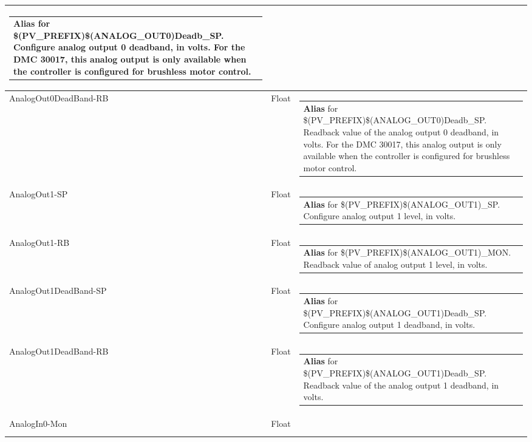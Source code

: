 \documentclass[openany]{article}
\begin{document}
\begin{longtable}{| m{4.5cm} m{2.5cm}  m{8.5cm} |}
\begin{tabular}{@{}m{6cm}@{}}
                \textbf{\color{blue} Alias} for \$(PV\_PREFIX)\$(ANALOG\_OUT0)Deadb\_SP. Configure analog output 0 deadband, in volts. For the DMC 30017, this analog output is only available when the controller is configured for brushless motor control.
            \end{tabular} \hypertarget{}{}\\ \hline
        AnalogOut0DeadBand-RB & Float & \begin{tabular}{@{}m{6cm}@{}}
                \textbf{\color{blue} Alias} for \$(PV\_PREFIX)\$(ANALOG\_OUT0)Deadb\_SP. Readback value of the analog output 0 deadband, in volts. For the DMC 30017, this analog output is only available when the controller is configured for brushless motor control.
            \end{tabular} \hypertarget{pv:analog-out-1}{}\\ \hline
        AnalogOut1-SP & Float & \begin{tabular}{@{}m{6cm}@{}}
                \textbf{\color{blue} Alias} for \$(PV\_PREFIX)\$(ANALOG\_OUT1)\_SP. Configure analog output 1 level, in volts.
            \end{tabular} \hypertarget{}{}\\ \hline
        AnalogOut1-RB & Float & \begin{tabular}{@{}m{6cm}@{}}
                \textbf{\color{blue} Alias} for \$(PV\_PREFIX)\$(ANALOG\_OUT1)\_MON. Readback value of analog output 1 level, in volts.
            \end{tabular} \hypertarget{pv:analog-out-1-dead-band}{}\\ \hline
        AnalogOut1DeadBand-SP & Float & \begin{tabular}{@{}m{6cm}@{}}
                \textbf{\color{blue} Alias} for \$(PV\_PREFIX)\$(ANALOG\_OUT1)Deadb\_SP. Configure analog output 1 deadband, in volts.
            \end{tabular} \hypertarget{}{}\\ \hline
        AnalogOut1DeadBand-RB & Float & \begin{tabular}{@{}m{6cm}@{}}
                \textbf{\color{blue} Alias} for \$(PV\_PREFIX)\$(ANALOG\_OUT1)Deadb\_SP. Readback value of the analog output 1 deadband, in volts.
            \end{tabular} \hypertarget{pv:analog-in-0-mon}{}\\ \hline
        AnalogIn0-Mon & Float & \begin{tabular}{@{}m{6cm}@{}}

\end{tabular}
\end{longtable}
\end{document}
